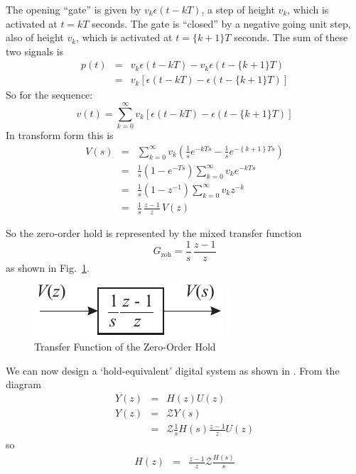 The opening ``gate'' is given by $v_k \epsilon (t-kT)$, a step of height
$v_k$, which is activated at $t=kT$ seconds. The gate is ``closed'' by
a negative going unit step, also of height $v_k$, which is activated
at $t=\{k+1\}T$ seconds. The sum of these two signals is 
\begin{eqnarray*}
  p(t) &=& v_k \epsilon(t - kT) - v_k \epsilon(t - \{k+1\}T)\\
       &=& v_k\left[\epsilon(t - kT) - \epsilon(t - \{k+1\}T)\right]
\end{eqnarray*}
So for the sequence:
\begin{equation}
  \label{eq:l11e5}
  v(t) = \sum_{k=0}^{\infty} v_k\left[\epsilon(t - kT) - \epsilon(t - \{k+1\}T)\right]
\end{equation}
In transform form this is
\begin{eqnarray*}
  V(s) &=& \sum_{k=0}^{\infty} v_k\left(\frac{1}{s}e^{-kTs} -
  \frac{1}{s}e^{-\left\{k+1\right\}Ts}\right)\\
       &=& \frac{1}{s}\left(1-e^{-Ts}\right) \sum_{k=0}^{\infty} v_k
  e^{-kTs}\\
       &=& \frac{1}{s}\left(1-z^{-1}\right) \sum_{k=0}^{\infty} v_k
  z^{-k}\\
       &=& \frac{1}{s}\,\frac{z-1}{z}\,V(z)
\end{eqnarray*}

So the zero-order hold is represented by the mixed transfer function 
\begin{equation}
  \label{eq:l11e10}
  G_{\mathrm{zoh}}=\frac{1}{s}\,\frac{z-1}{z}
\end{equation}
as shown in Fig.~\ref{fig:l11f2}.
\begin{figure}[htbp]
  \begin{center}
    \includegraphics{pictures/zohtf.pdf}
    \caption{Transfer Function of the Zero-Order Hold}
    \label{fig:l11f2}
  \end{center}
\end{figure}

We can now design a `hold-equivalent' digital system as shown in
. From the diagram
\begin{eqnarray*}
  Y(z) &=& H(z) U(z)\\
  Y(z) &=& \mathcal{Z} Y(s)\\
       &=& \mathcal{Z} \frac{1}{s} H(s) \frac{z-1}{z} U(z)
\end{eqnarray*}
so
\begin{eqnarray}\label{eq:l11e14}
  H(z) &=& \frac{z-1}{z} \mathcal{Z} \frac{H(s)}{s}
\end{eqnarray}

